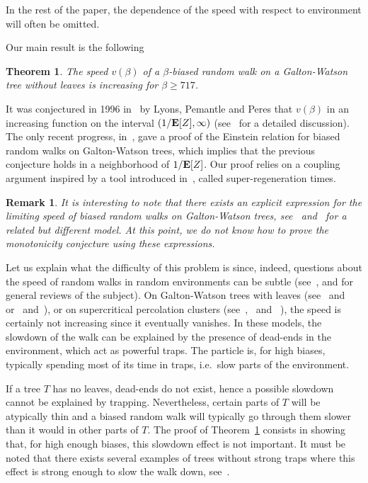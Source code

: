 \documentclass[12pt]{amsart}
\numberwithin{equation}{section}
\newtheorem{theorem}{Theorem}[section]
\newtheorem{remark}{Remark}[section]
\begin{document}
In the rest of the paper, the dependence of the speed with respect to environment will often be omitted.

Our main result is the following
\begin{theorem}
\label{theorem}
The speed $v(\beta)$ of a $\beta$-biased random walk on a Galton-Watson tree without leaves is increasing for $\beta \geq 717$.
\end{theorem}
 
 It was conjectured in 1996 in~\cite{LPP} by Lyons, Pemantle and Peres that $v(\beta)$  in an increasing function  on the interval $(1/{\bf E}[Z],\infty)$ (see~\cite{Lpart} for a detailed discussion). The only recent progress, in~\cite{BHOZ}, gave a proof of the Einstein relation for biased random walks on Galton-Watson trees, which implies that the previous conjecture holds in a neighborhood of $1/{\bf E}[Z]$. Our proof relies on a coupling argument inspired by a tool introduced in~\cite{FG}, called super-regeneration times.

\begin{remark}
It is interesting to note that there exists an explicit expression for the limiting speed of biased random walks on Galton-Watson trees, see~\cite{Aidekon} and~\cite{GPV} for a related but different model. At this point, we do not know how to 
prove the monotonicity conjecture using these expressions.
\end{remark}
 
 Let us explain what the difficulty of this problem is since, indeed, questions about the speed of  random walks in random environments can be subtle (see~\cite{Zeitouni}, \cite{SZ2} and \cite{sznitmannew} for general reviews of the subject). On Galton-Watson trees with leaves (see~\cite{LPP} and~\cite{FG} or~\cite{GBA} and~\cite{H}), or on supercritical percolation clusters (see~\cite{BGP},~\cite{Sznitman} and ~\cite{FH}), the speed is certainly not increasing since it eventually vanishes. In these models, the slowdown of the walk can be explained by the presence of dead-ends in the environment, which act as powerful traps. The particle is, for high biases, typically spending most of its time in traps, i.e.~slow parts of the environment. 

If a tree  $T$ has no leaves, dead-ends do not exist, hence a possible slowdown cannot be explained by trapping. Nevertheless, certain parts of $T$ will be atypically thin and a biased random walk will typically go through them slower than it would in other parts of $T$. The proof of Theorem~\ref{theorem} consists in showing that, for high enough biases, this slowdown effect is not important. It must be noted that there exists several examples of trees without strong traps where this effect is strong enough to slow the walk down, see~\cite{Lpart}. 
\end{document}
